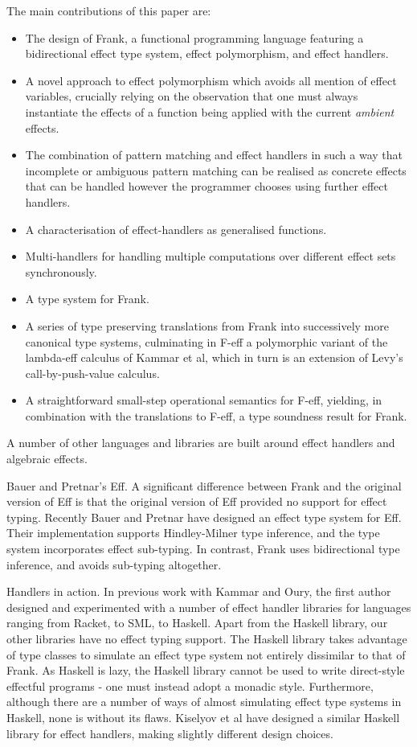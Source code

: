 \documentclass[preprint]{sigplanconf}
\begin{document}
The main contributions of this paper are:
\begin{itemize}
\item The design of Frank, a functional programming language featuring
  a bidirectional effect type system, effect polymorphism, and effect
  handlers.
\item A novel approach to effect polymorphism which avoids all mention
  of effect variables, crucially relying on the observation that one
  must always instantiate the effects of a function being applied with
  the current \emph{ambient} effects.
\item The combination of pattern matching and effect handlers in such
  a way that incomplete or ambiguous pattern matching can be realised
  as concrete effects that can be handled however the programmer
  chooses using further effect handlers.
\item A characterisation of effect-handlers as generalised functions.
\item Multi-handlers for handling multiple computations over different
  effect sets synchronously.
\item A type system for Frank.
\item A series of type preserving translations from Frank into
  successively more canonical type systems, culminating in F-eff a
  polymorphic variant of the lambda-eff calculus of Kammar et al,
  which in turn is an extension of Levy's call-by-push-value calculus.
\item A straightforward small-step operational semantics for F-eff,
  yielding, in combination with the translations to F-eff, a type
  soundness result for Frank.
\end{itemize}

A number of other languages and libraries are built around effect
handlers and algebraic effects.

Bauer and Pretnar's Eff. A significant difference between Frank and
the original version of Eff is that the original version of Eff
provided no support for effect typing. Recently Bauer and Pretnar have
designed an effect type system for Eff. Their implementation supports
Hindley-Milner type inference, and the type system incorporates effect
sub-typing. In contrast, Frank uses bidirectional type inference, and
avoids sub-typing altogether.

Handlers in action. In previous work with Kammar and Oury, the first
author designed and experimented with a number of effect handler
libraries for languages ranging from Racket, to SML, to Haskell. Apart
from the Haskell library, our other libraries have no effect typing
support. The Haskell library takes advantage of type classes to
simulate an effect type system not entirely dissimilar to that of
Frank. As Haskell is lazy, the Haskell library cannot be used to write
direct-style effectful programs - one must instead adopt a monadic
style. Furthermore, although there are a number of ways of almost
simulating effect type systems in Haskell, none is without its
flaws. Kiselyov et al have designed a similar Haskell library for
effect handlers, making slightly different design choices.
\end{document}
